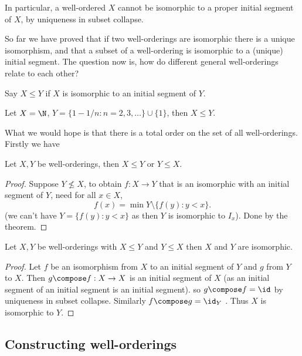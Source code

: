 \documentclass[a4paper]{article}
\begin{document}
In particular, a well-ordered \(X\) cannot be isomorphic to a proper initial segment of \(X\), by uniqueness in subset collapse.

So far we have proved that if two well-orderings are isomorphic there is a unique isomorphism, and that a subset of a well-ordering is isomorphic to a (unique) initial segment. The question now is, how do different general well-orderings relate to each other?

\begin{definition}
  Say \(X \leq Y\) if \(X\) is isomorphic to an initial segment of \(Y\).
\end{definition}

\begin{eg}
  Let \(X = \N\), \(Y = \{1 - 1/n: n = 2, 3, \dots\} \cup \{1\}\), then \(X \leq Y\).
\end{eg}

What we would hope is that there is a total order on the set of all well-orderings. Firstly we have

\begin{theorem}
  Let \(X, Y\) be well-orderings, then \(X \leq Y\) or \(Y \leq X\).
\end{theorem}

\begin{proof}
  Suppose \(Y \nleq X\), to obtain \(f: X \to Y\) that is an isomorphic with an initial segment of \(Y\), need for all \(x \in X\),
  \[
    f(x) = \min Y \setminus \{f(y): y < x\}.
  \]
  (we can't have \(Y = \{f(y): y < x\}\) as then \(Y\) is isomorphic to \(I_x\)). Done by the theorem.
\end{proof}

\begin{proposition}
  Let \(X, Y\) be well-orderings with \(X \leq Y\) and \(Y \leq X\) then \(X\) and \(Y\) are isomorphic.
\end{proposition}

\begin{proof}
  Let \(f\) be an isomorphism from \(X\) to an initial segment of \(Y\) and \(g\) from \(Y\) to \(X\). Then \(g \compose f: X \to X\) is an initial segment of \(X\) (as an initial segment of an initial segment is an initial segment). so \(g \compose f = \id\) by uniqueness in subset collapse. Similarly \(f \compose g = \id_Y\) . Thus \(X\) is isomorphic to \(Y\).
\end{proof}

\subsection{Constructing well-orderings}
\end{document}
